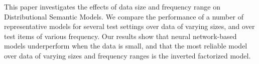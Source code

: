 This paper investigates the effects of data size and frequency range on Distributional Semantic Models. We compare the performance of a number of representative models for several test settings over data of varying sizes, and over test items of various frequency. Our results show that neural network-based models underperform when the data is small, and that the most reliable model over data of varying sizes and frequency ranges is the inverted factorized model.
